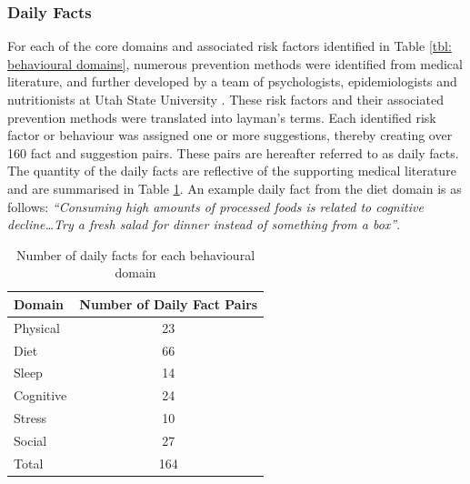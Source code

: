 \subsubsection{Daily Facts}
For each of the core domains and associated risk factors identified in Table \ref{tbl: behavioural domains},  numerous prevention methods were identified from medical literature, and further developed by a team of psychologists, epidemiologists and nutritionists at Utah State University \cite{Norton2015-TRCI}. These risk factors and their associated prevention methods were translated into layman's terms. Each identified risk factor or behaviour was assigned one or more suggestions, thereby creating over 160 fact and suggestion pairs. These pairs are hereafter referred to as daily facts. The quantity of the daily facts are reflective of the supporting medical literature and are summarised in Table \ref{tbl: daily fact count}. An example daily fact from the diet domain is as follows: \textit{“Consuming high amounts of processed foods is related to cognitive decline\ldots Try a fresh salad for dinner instead of something from a box”}.
\begin{table}
\centering
\caption{Number of daily facts for each behavioural domain}
\label{tbl: daily fact count}
\begin{tabular}{@{}l c@{}}
\toprule
Domain    & Number of Daily Fact Pairs \\ 	\midrule
Physical  & 23                              \\
Diet      & 66                              \\
Sleep     & 14                              \\
Cognitive & 24                              \\
Stress    & 10                             	\\
Social    & 27                              \\ \hline \hline
Total	  & 164								\\	\bottomrule
\end{tabular}
\end{table}

